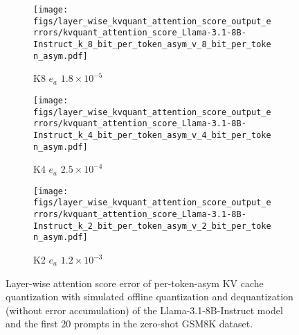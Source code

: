 \begin{figure}[htbp]
\centering
    \begin{subfigure}{.315\linewidth}
    \texttt{[image: figs/layer\_wise\_kvquant\_attention\_score\_output\_errors/kvquant\_attention\_score\_Llama-3.1-8B-Instruct\_k\_8\_bit\_per\_token\_asym\_v\_8\_bit\_per\_token\_asym.pdf]}    
    \caption{K8 $e_a$ $1.8 \!\!\times\!\! 10^{-5}$}
    \label{fig:kvcache_simulated_quant_attention_score_error_layer_wise_k8v8_per_token_asym_Llama-3.1-8B-Instruct}
    \end{subfigure}
    \begin{subfigure}{.315\linewidth}
    \texttt{[image: figs/layer\_wise\_kvquant\_attention\_score\_output\_errors/kvquant\_attention\_score\_Llama-3.1-8B-Instruct\_k\_4\_bit\_per\_token\_asym\_v\_4\_bit\_per\_token\_asym.pdf]}
    \caption{K4 $e_a$ $2.5 \!\!\times\!\! 10^{-4}$}
    \label{fig:kvcache_simulated_quant_attention_score_error
    _layer_wise_k4v4_per_token_asym_Llama-3.1-8B-Instruct}
    \end{subfigure}
    \begin{subfigure}{.315\linewidth}
    \texttt{[image: figs/layer\_wise\_kvquant\_attention\_score\_output\_errors/kvquant\_attention\_score\_Llama-3.1-8B-Instruct\_k\_2\_bit\_per\_token\_asym\_v\_2\_bit\_per\_token\_asym.pdf]}
    \caption{K2 $e_a$ $1.2 \!\!\times\!\! 10^{-3}$}
    \label{fig:kvcache_simulated_quant_attention_score_error_layer_wise_k2v2_per_token_asym_Llama-3.1-8B-Instruct}
    \end{subfigure}
    \caption{Layer-wise attention score error of per-token-asym KV cache quantization with simulated offline quantization and dequantization (without error accumulation) of the Llama-3.1-8B-Instruct model and the first 20 prompts in the zero-shot GSM8K dataset.}
\label{fig:kvcache_simulated_quant_attention_score_error_layer_wise_key_842bit_per_token_asym_llama3.1_8b}
\end{figure}
